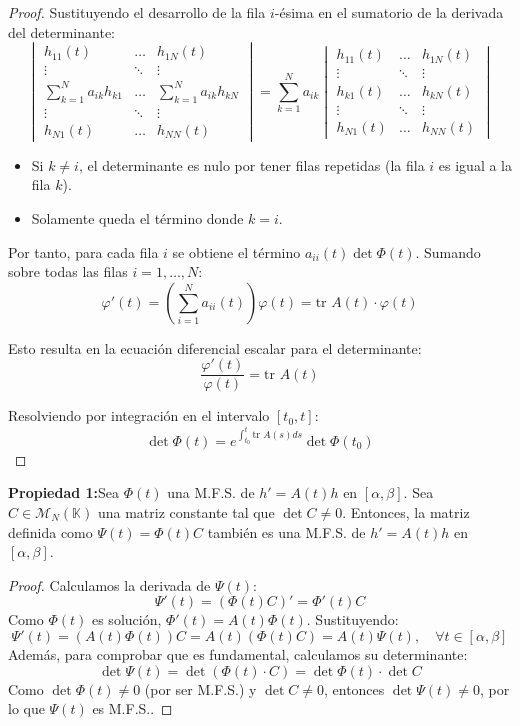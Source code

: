 \begin{proof}
Sustituyendo el desarrollo de la fila $i$-ésima en el sumatorio de la derivada del determinante:
\[
\begin{vmatrix} 
h_{11}(t) & \dots & h_{1N}(t) \\ 
\vdots & \ddots & \vdots \\ 
\sum_{k=1}^N a_{ik}h_{k1} & \dots & \sum_{k=1}^N a_{ik}h_{kN} \\ 
\vdots & \ddots & \vdots \\ 
h_{N1}(t) & \dots & h_{NN}(t) 
\end{vmatrix} = \sum_{k=1}^N a_{ik} \begin{vmatrix} 
h_{11}(t) & \dots & h_{1N}(t) \\ 
\vdots & \ddots & \vdots \\ 
h_{k1}(t) & \dots & h_{kN}(t) \\ 
\vdots & \ddots & \vdots \\ 
h_{N1}(t) & \dots & h_{NN}(t) 
\end{vmatrix} 
\]

\begin{itemize}
    \item Si $k \neq i$, el determinante es nulo por tener filas repetidas (la fila $i$ es igual a la fila $k$).
    \item Solamente queda el término donde $k = i$.
\end{itemize}

Por tanto, para cada fila $i$ se obtiene el término $a_{ii}(t) \det \Phi(t)$. Sumando sobre todas las filas $i=1, \dots, N$:
\[
\varphi'(t) = \left( \sum_{i=1}^N a_{ii}(t) \right) \varphi(t) = \text{tr } A(t) \cdot \varphi(t)
\]

Esto resulta en la ecuación diferencial escalar para el determinante:
\[
\frac{\varphi'(t)}{\varphi(t)} = \text{tr } A(t) 
\]

Resolviendo por integración en el intervalo $[t_0, t]$:
\[
\det \Phi(t) = e^{\int_{t_0}^t \text{tr } A(s) ds} \det \Phi(t_0) 
\]
\end{proof}

\begin{proposición}
\textbf{Propiedad 1:}Sea $\Phi(t)$ una M.F.S. de $h' = A(t)h$ en $[\alpha, \beta]$. Sea $C \in \mathcal{M}_N(\mathbb{K})$ una matriz constante tal que $\det C \neq 0$. Entonces, la matriz definida como $\Psi(t) = \Phi(t) C$ también es una M.F.S. de $h' = A(t)h$ en $[\alpha, \beta]$.
\end{proposición}

\begin{proof}
Calculamos la derivada de $\Psi(t)$:
\[ \Psi'(t) = (\Phi(t)C)' = \Phi'(t)C \text{} \] 
Como $\Phi(t)$ es solución, $\Phi'(t) = A(t)\Phi(t)$. Sustituyendo:
\[ \Psi'(t) = (A(t)\Phi(t))C = A(t)(\Phi(t)C) = A(t)\Psi(t), \quad \forall t \in [\alpha, \beta] \text{} \] 
Además, para comprobar que es fundamental, calculamos su determinante:
\[ \det \Psi(t) = \det(\Phi(t) \cdot C) = \det \Phi(t) \cdot \det C \text{} \] 
Como $\det \Phi(t) \neq 0$ (por ser M.F.S.) y $\det C \neq 0$, entonces $\det \Psi(t) \neq 0$, por lo que $\Psi(t)$ es M.F.S..
\end{proof}

